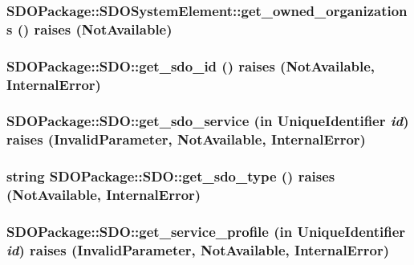 \subsubsection{ SDOPackage::SDOSystem\-Element::get\_\-owned\_\-organizations ()  raises (Not\-Available)\hspace{0.3cm}{\tt  [inherited]}}\label{interfaceSDOPackage_1_1SDOSystemElement_SDOPackage_1_1SDOSystemElementa0}


\subsubsection{ SDOPackage::SDO::get\_\-sdo\_\-id ()  raises (Not\-Available, Internal\-Error)}\label{interfaceSDOPackage_1_1SDO_SDOPackage_1_1SDOa0}


\subsubsection{ SDOPackage::SDO::get\_\-sdo\_\-service (in {\bf Unique\-Identifier} {\em id})  raises (Invalid\-Parameter, Not\-Available, Internal\-Error)}\label{interfaceSDOPackage_1_1SDO_SDOPackage_1_1SDOa5}


\subsubsection{\setlength{\rightskip}{0pt plus 5cm}string SDOPackage::SDO::get\_\-sdo\_\-type ()  raises (Not\-Available, Internal\-Error)}\label{interfaceSDOPackage_1_1SDO_SDOPackage_1_1SDOa1}


\subsubsection{ SDOPackage::SDO::get\_\-service\_\-profile (in {\bf Unique\-Identifier} {\em id})  raises (Invalid\-Parameter, Not\-Available, Internal\-Error)}\label{interfaceSDOPackage_1_1SDO_SDOPackage_1_1SDOa4}


